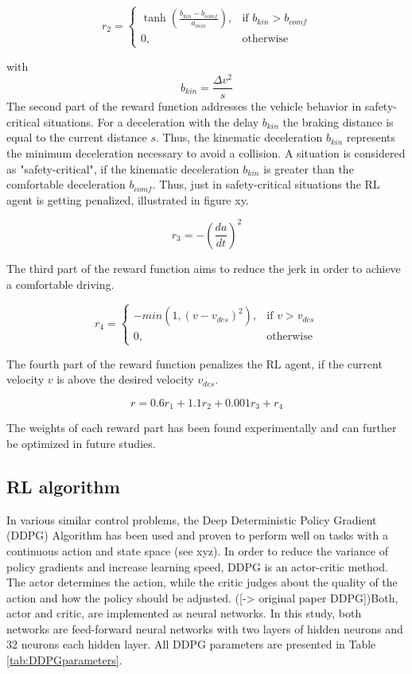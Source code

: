 \documentclass[review]{elsarticle}
\begin{document}
\begin{equation}
r_2 = 
\begin{cases}
\tanh\left(\frac{b_{kin}-b_{comf}}{a_{min}}\right),& \text{if } b_{kin}>b_{comf}\\
0,              & \text{otherwise}
\end{cases}
\end{equation}

with
\begin{equation}
b_{kin} = \frac{\Delta v^2}{s}
\end{equation}
The second part of the reward function addresses the vehicle behavior in safety-critical situations.
For a deceleration with the delay $b_{kin}$ the braking distance is equal to the current distance $s$. Thus, the kinematic deceleration $b_{kin}$ represents the minimum deceleration necessary to avoid a collision. A situation is considered as "safety-critical", if the kinematic deceleration $b_{kin}$ is greater than the comfortable deceleration $b_{comf}$. Thus, just in safety-critical situations the RL agent is getting penalized, illustrated in figure xy.

\begin{equation}
r_3 = -\left(\dfrac{da}{dt}\right)^2
\end{equation}

The third part of the reward function aims to reduce the jerk in order to achieve a comfortable driving. 

\begin{equation}
r_4 =  
\begin{cases} 
 -min\left(1,\left( v - v_{des}\right)^2\right), & \text{if } v>v_{des}\\
0, & \text{otherwise}
\end{cases}             
\end{equation}

The fourth part of the reward function penalizes the RL agent, if the current velocity $v$ is above the desired velocity $v_{des}$. 

\begin{equation}
r = 0.6r_1 + 1.1r_2 + 0.001 r_3 + r_4
\end{equation}

The weights of each reward part has been found experimentally and can further be optimized in future studies.

\subsection{RL algorithm}
In various similar control problems, the Deep Deterministic Policy Gradient (DDPG) Algorithm has been used and proven to perform well on tasks with a continuous action and state space (see xyz). In order to reduce the variance of policy gradients and increase learning speed, DDPG is an actor-critic method. The actor determines the action, while the critic judges about the quality of the action and how the policy should be adjusted. ([-> original paper DDPG])Both, actor and critic, are implemented as neural networks. In this study, both networks are feed-forward neural networks with two layers of hidden neurons and 32 neurons each hidden layer. All DDPG parameters are presented in Table \ref{tab:DDPGparameters}.
\end{document}
